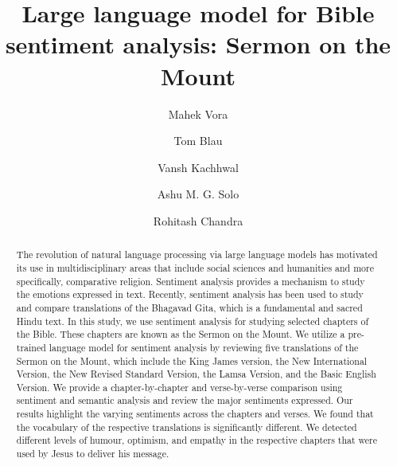 \documentclass[5p,times]{elsarticle}
\begin{document}
\begin{frontmatter}
 
\title{Large language model for Bible sentiment analysis: Sermon on the Mount}                       

 
 
\author[Second]{Mahek Vora} 
 
\author[Third]{Tom Blau}
 
\author[Fourth]{Vansh Kachhwal}

\author[Fifth]{Ashu M. G. Solo}


\author[First,ping]{Rohitash Chandra  }

 

\address[Second]{  Indian Institute of Technology Guwahati, Assam, India}

\address[Third]{Data61, Commonwealth Scientific and Industrial Research Organisation, Sydney, Australia}

\address[Fourth]{Indian Institute of Technology Delhi, India}

\address[Fifth]{ Maverick Trailblazers Inc., Wilmington, Delaware, U.S.A.}
\address[First]{ Transitional Artificial Intelligence Research Group, School of Mathematics and Statistics, UNSW Sydney, Sydney, Australia}

\address[ping]{Pingala Institute of Artificial Intelligence, Sydney, Australia}

\begin{abstract}

The revolution of natural language processing via large language models has motivated its use in multidisciplinary areas that include social sciences and humanities and more specifically, comparative religion. Sentiment analysis provides a mechanism to study the emotions expressed in text. Recently, sentiment analysis has been used to study and compare translations of the Bhagavad Gita, which is a fundamental and sacred Hindu text.  In this study, we use sentiment analysis for studying selected chapters of the Bible.  These chapters are known as the Sermon on the Mount. We utilize a pre-trained language model for sentiment analysis by reviewing five translations of the  Sermon on the Mount, which include the King James version, the New International Version, the New Revised Standard Version, the Lamsa Version, and the Basic English Version. We provide a  chapter-by-chapter and verse-by-verse comparison using sentiment and semantic analysis and review the major sentiments expressed. Our results highlight the varying sentiments across the chapters and verses. We found that the vocabulary of the respective translations is significantly different.  We detected different levels of humour, optimism, and empathy in the respective chapters that were used by Jesus to deliver his message.



\end{abstract}
\end{frontmatter}
\end{document}
